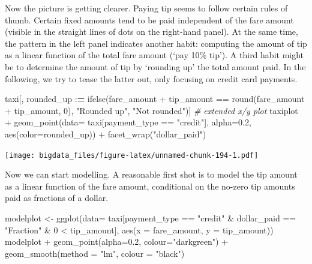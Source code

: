 \documentclass[
  12pt,
]{style/krantz}
\newenvironment{Shaded}{\begin{snugshade}}{\end{snugshade}}
\newcommand{\AttributeTok}[1]{\textcolor[rgb]{0.77,0.63,0.00}{#1}}
\newcommand{\CommentTok}[1]{\textcolor[rgb]{0.56,0.35,0.01}{\textit{#1}}}
\newcommand{\DecValTok}[1]{\textcolor[rgb]{0.00,0.00,0.81}{#1}}
\newcommand{\ErrorTok}[1]{\textcolor[rgb]{0.64,0.00,0.00}{\textbf{#1}}}
\newcommand{\FloatTok}[1]{\textcolor[rgb]{0.00,0.00,0.81}{#1}}
\newcommand{\FunctionTok}[1]{\textcolor[rgb]{0.00,0.00,0.00}{#1}}
\newcommand{\NormalTok}[1]{#1}
\newcommand{\OtherTok}[1]{\textcolor[rgb]{0.56,0.35,0.01}{#1}}
\newcommand{\SpecialCharTok}[1]{\textcolor[rgb]{0.00,0.00,0.00}{#1}}
\newcommand{\StringTok}[1]{\textcolor[rgb]{0.31,0.60,0.02}{#1}}
\begin{document}
Now the picture is getting clearer. Paying tip seems to follow certain rules of thumb. Certain fixed amounts tend to be paid independent of the fare amount (visible in the straight lines of dots on the right-hand panel). At the same time, the pattern in the left panel indicates another habit: computing the amount of tip as a linear function of the total fare amount (`pay 10\% tip'). A third habit might be to determine the amount of tip by `rounding up' the total amount paid. In the following, we try to tease the latter out, only focusing on credit card payments.

\begin{Shaded}
\begin{Highlighting}[]
\NormalTok{taxi[, rounded\_up }\SpecialCharTok{:}\ErrorTok{=} \FunctionTok{ifelse}\NormalTok{(fare\_amount }\SpecialCharTok{+}\NormalTok{ tip\_amount }\SpecialCharTok{==} \FunctionTok{round}\NormalTok{(fare\_amount }\SpecialCharTok{+}\NormalTok{ tip\_amount, }\DecValTok{0}\NormalTok{),}
                            \StringTok{"Rounded up"}\NormalTok{,}
                            \StringTok{"Not rounded"}\NormalTok{)]}
\CommentTok{\# extended x/y plot}
\NormalTok{taxiplot }\SpecialCharTok{+}
     \FunctionTok{geom\_point}\NormalTok{(}\AttributeTok{data=}\NormalTok{ taxi[payment\_type }\SpecialCharTok{==} \StringTok{"credit"}\NormalTok{],}
                \AttributeTok{alpha=}\FloatTok{0.2}\NormalTok{, }\FunctionTok{aes}\NormalTok{(}\AttributeTok{color=}\NormalTok{rounded\_up)) }\SpecialCharTok{+}
     \FunctionTok{facet\_wrap}\NormalTok{(}\StringTok{"dollar\_paid"}\NormalTok{)}
\end{Highlighting}
\end{Shaded}

\texttt{[image: bigdata\_files/figure-latex/unnamed-chunk-194-1.pdf]}

Now we can start modelling. A reasonable first shot is to model the tip amount as a linear function of the fare amount, conditional on the no-zero tip amounts paid as fractions of a dollar.

\begin{Shaded}
\begin{Highlighting}[]
\NormalTok{modelplot }\OtherTok{\textless{}{-}} \FunctionTok{ggplot}\NormalTok{(}\AttributeTok{data=}\NormalTok{ taxi[payment\_type }\SpecialCharTok{==} \StringTok{"credit"} \SpecialCharTok{\&}\NormalTok{ dollar\_paid }\SpecialCharTok{==} \StringTok{"Fraction"} \SpecialCharTok{\&} \DecValTok{0} \SpecialCharTok{\textless{}}\NormalTok{ tip\_amount],}
                    \FunctionTok{aes}\NormalTok{(}\AttributeTok{x =}\NormalTok{ fare\_amount, }\AttributeTok{y =}\NormalTok{ tip\_amount))}
\NormalTok{modelplot }\SpecialCharTok{+}
     \FunctionTok{geom\_point}\NormalTok{(}\AttributeTok{alpha=}\FloatTok{0.2}\NormalTok{, }\AttributeTok{colour=}\StringTok{"darkgreen"}\NormalTok{) }\SpecialCharTok{+}
     \FunctionTok{geom\_smooth}\NormalTok{(}\AttributeTok{method =} \StringTok{"lm"}\NormalTok{, }\AttributeTok{colour =} \StringTok{"black"}\NormalTok{)}
\end{Highlighting}
\end{Shaded}
\end{document}
